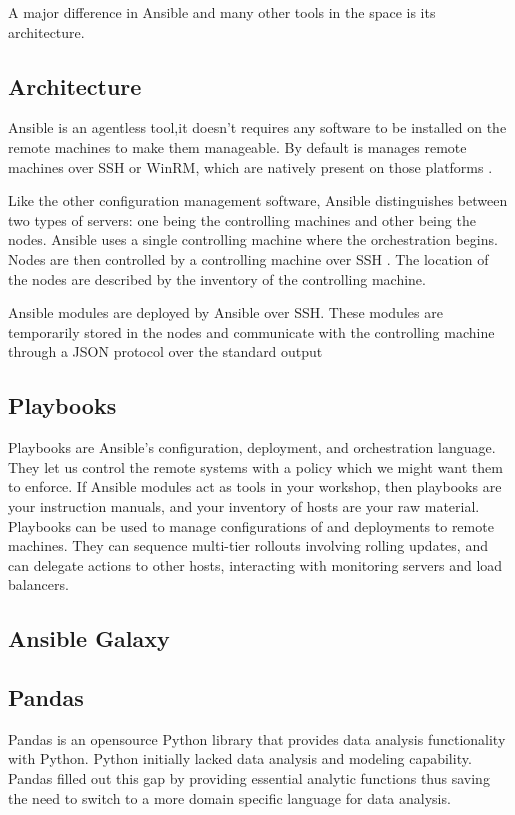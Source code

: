 \documentclass[9pt,twocolumn,twoside]{../../styles/osajnl}
\begin{document}
A major difference in Ansible and many other tools in the
space is its architecture.

\subsection{Architecture}
Ansible is an agentless tool,it doesn't requires any software to be
installed on the remote machines to make them manageable. By default
is manages remote machines over SSH or WinRM, which are natively
present on those platforms \cite{www-ansible-architecture}.

Like the other configuration management software, Ansible
distinguishes between two types of servers: one being the controlling
machines and other being the nodes. Ansible uses a single controlling
machine where the orchestration begins. Nodes are then controlled by a
controlling machine over SSH \cite{www-ssh}. The location of the nodes
are described by the inventory of the controlling machine.

Ansible modules are deployed by Ansible over SSH. These modules are
temporarily stored in the nodes and communicate with the controlling
machine through a JSON protocol over the standard output

\subsection{Playbooks}

Playbooks \cite{www-ansible-playbook} are Ansible’s configuration,
deployment, and orchestration language. They let us control the remote
systems with a policy which we might want them to enforce. If Ansible
modules act as tools in your workshop, then playbooks are your
instruction manuals, and your inventory of hosts are your raw
material. Playbooks can be used to manage configurations of and
deployments to remote machines. They can sequence multi-tier rollouts
involving rolling updates, and can delegate actions to other hosts,
interacting with monitoring servers and load balancers.

\subsection{Ansible Galaxy}





\subsection{Pandas}
Pandas is an opensource Python library that provides data analysis
functionality with Python. Python initially lacked data analysis and
modeling capability. Pandas filled out this gap by providing essential
analytic functions thus saving the need to switch to a more domain
specific language for data analysis.
\end{document}
